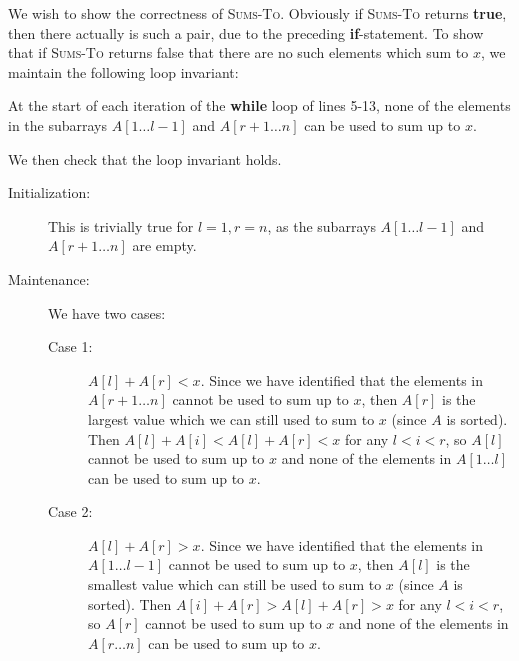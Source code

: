 \documentclass[Chapter02]{subfiles}
\begin{document}
\begin{enumerate}[leftmargin=\labelsep]
\begin{answer}
\begin{algorithm}[H]
			\end{algorithm}

			We wish to show the correctness of \textsc{Sums-To}. Obviously if \textsc{Sums-To} returns \textbf{true}, then there actually is such a pair, due to the preceding \textbf{if}-statement. To show that if \textsc{Sums-To} returns false that there are no such elements which sum to $x$, we maintain the following loop invariant:

			\begin{addmargin}[2em]{2em}
				At the start of each iteration of the \textbf{while} loop of lines 5-13, none of the elements in the subarrays $A[1 \dots l - 1]$ and $A[r + 1 \dots n]$ can be used to sum up to $x$.
			\end{addmargin}

			We then check that the loop invariant holds.

			\begin{description}
				\item[Initialization:] This is trivially true for $l = 1, r = n$, as the subarrays $A[1 \dots l - 1]$ and $A[r + 1 \dots n]$ are empty.

				\item[Maintenance:] We have two cases:
				\begin{description}
					\item[Case 1:] $A[l] + A[r] < x$. Since we have identified that the elements in $A[r + 1 \dots n]$ cannot be used to sum up to $x$, then $A[r]$ is the largest value which we can still used to sum to $x$ (since $A$ is sorted). Then $A[l] + A[i] < A[l] + A[r] < x$ for any $l < i < r$, so $A[l]$ cannot be used to sum up to $x$ and none of the elements in $A[1 \dots l]$ can be used to sum up to $x$.

					\item[Case 2:] $A[l] + A[r] > x$. Since we have identified that the elements in $A[1 \dots l - 1]$ cannot be used to sum up to $x$, then $A[l]$ is the smallest value which can still be used to sum to $x$ (since $A$ is sorted). Then $A[i] + A[r] > A[l] + A[r] > x$ for any $l < i < r$, so $A[r]$ cannot be used to sum up to $x$ and none of the elements in $A[r \dots n]$ can be used to sum up to $x$.
				\end{description}


\end{description}
\end{answer}
\end{enumerate}
\end{document}

